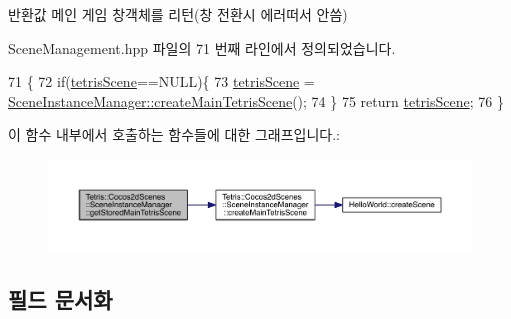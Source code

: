 \begin{DoxyReturn}{반환값}
메인 게임 창객체를 리턴(창 전환시 에러떠서 안씀) 
\end{DoxyReturn}


Scene\+Management.\+hpp 파일의 71 번째 라인에서 정의되었습니다.


\begin{DoxyCode}
71                                          \{
72             \textcolor{keywordflow}{if}(\hyperlink{class_tetris_1_1_cocos2d_scenes_1_1_scene_instance_manager_a7952a2c89cda55aba40056a7c9236ded}{tetrisScene}==NULL)\{
73                 \hyperlink{class_tetris_1_1_cocos2d_scenes_1_1_scene_instance_manager_a7952a2c89cda55aba40056a7c9236ded}{tetrisScene} =
      \hyperlink{class_tetris_1_1_cocos2d_scenes_1_1_scene_instance_manager_a536188c1cdb7cb46ebd2edc8ebf1f17a}{SceneInstanceManager::createMainTetrisScene}();
74             \}
75             \textcolor{keywordflow}{return} \hyperlink{class_tetris_1_1_cocos2d_scenes_1_1_scene_instance_manager_a7952a2c89cda55aba40056a7c9236ded}{tetrisScene};
76         \}
\end{DoxyCode}
이 함수 내부에서 호출하는 함수들에 대한 그래프입니다.\+:
\nopagebreak
\begin{figure}[H]
\begin{center}
\leavevmode
\includegraphics[width=350pt]{d1/d6f/class_tetris_1_1_cocos2d_scenes_1_1_scene_instance_manager_af79d0ad920411ed2b87545b49bc32e6c_cgraph}
\end{center}
\end{figure}


\subsection{필드 문서화}
\mbox{\label{class_tetris_1_1_cocos2d_scenes_1_1_scene_instance_manager_aed6486f09ebd0506636943d3355de167}} 
